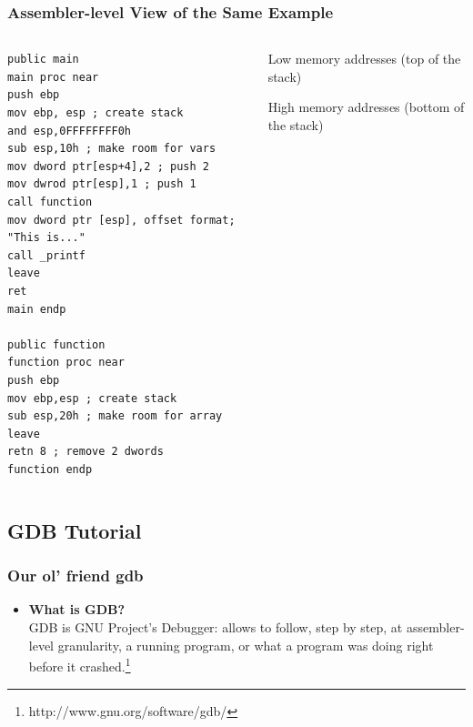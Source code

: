 \documentclass[]{beamer}
\begin{document}
\begin{frame}[fragile]
  \frametitle{Assembler-level View of the Same Example}
  \begin{columns}
    \begin{column}{.5\textwidth}

\begin{lstlisting}[language={[x86masm]Assembler},basicstyle=\tiny\ttfamily]
public main
main proc near
push ebp
mov ebp, esp ; create stack
and esp,0FFFFFFFF0h
sub esp,10h ; make room for vars
mov dword ptr[esp+4],2 ; push 2
mov dwrod ptr[esp],1 ; push 1
call function
mov dword ptr [esp], offset format; "This is..."
call _printf
leave
ret
main endp

public function
function proc near
push ebp
mov ebp,esp ; create stack
sub esp,20h ; make room for array
leave
retn 8 ; remove 2 dwords
function endp
\end{lstlisting}
    \end{column}

    \begin{column}{.5\textwidth}

      \begin{center}
        {\tiny Low memory addresses (top of the stack)}
        \begin{center}
        \end{center}
        {\tiny High memory addresses (bottom of the stack)}
      \end{center}
    \end{column}
  \end{columns}
  \begin{figure}
  \end{figure}
\end{frame}

\subsection{GDB Tutorial}
\begin{frame}
  \frametitle{Our ol' friend gdb}
  \begin{itemize}
  \item{{\bf What is GDB?}}\\
    GDB is GNU Project's Debugger: allows to follow, step by step, at assembler-level granularity, a running program, or what a program was doing right before it crashed.\footnote{http://www.gnu.org/software/gdb/}
  \end{itemize}
\end{frame}
\end{document}
